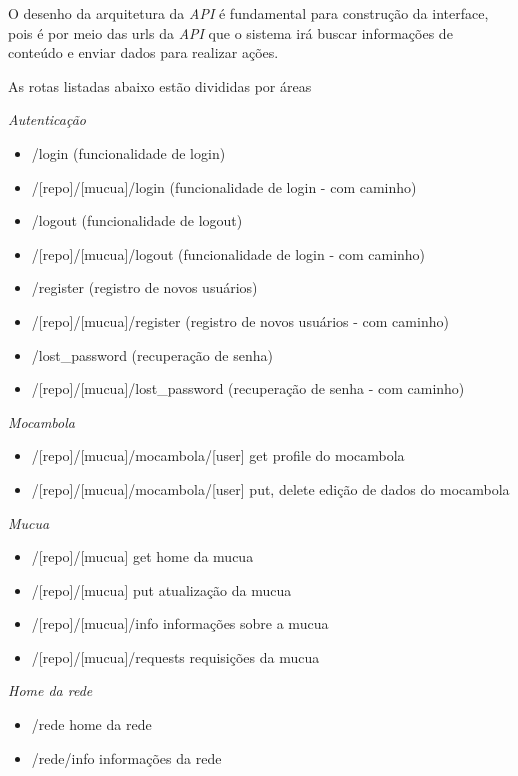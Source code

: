 O desenho da arquitetura da \emph{API} é fundamental para construção
da interface, pois é por meio das urls da \emph{API} que o sistema
irá buscar informações de conteúdo e enviar dados para realizar ações.

As rotas listadas abaixo estão divididas por áreas

\emph{Autenticação}
\begin{itemize}
  \item /login (funcionalidade de login)
  \item /[repo]/[mucua]/login (funcionalidade de login - com caminho)
  \item /logout (funcionalidade de logout)
  \item /[repo]/[mucua]/logout (funcionalidade de login - com caminho)
  \item /register (registro de novos usuários)
  \item /[repo]/[mucua]/register (registro de novos usuários - com caminho)
  \item /lost\_password (recuperação de senha)
  \item /[repo]/[mucua]/lost\_password (recuperação de senha - com caminho) 
\end{itemize}

\emph{Mocambola}
\begin{itemize}
  \item /[repo]/[mucua]/mocambola/[user] {get}          profile do mocambola
  \item /[repo]/[mucua]/mocambola/[user] {put, delete}  edição de dados do mocambola
\end{itemize}

\emph{Mucua}
\begin{itemize}
  \item /[repo]/[mucua] {get}         home da mucua
  \item /[repo]/[mucua] {put}         atualização da mucua
  \item /[repo]/[mucua]/info          informações sobre a mucua
  \item /[repo]/[mucua]/requests      requisições da mucua
\end{itemize}

\emph{Home da rede}
\begin{itemize}                
  \item /rede                         home da rede
  \item /rede/info                    informações da rede
\end{itemize}

